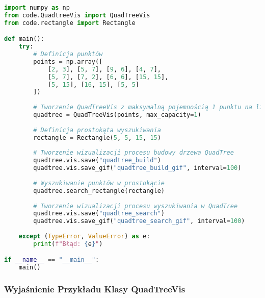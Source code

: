 \documentclass[12pt]{article}
\begin{document}
\begin{lstlisting}[language=Python, caption=Przykład użycia klasy QuadTreeVis, style=examplestyle]
import numpy as np
from code.QuadtreeVis import QuadTreeVis
from code.rectangle import Rectangle

def main():
    try:
        # Definicja punktów
        points = np.array([
            [2, 3], [5, 7], [9, 6], [4, 7],
            [5, 7], [7, 2], [6, 6], [15, 15],
            [5, 15], [16, 15], [5, 5]
        ])
        
        # Tworzenie QuadTreeVis z maksymalną pojemnością 1 punktu na liść
        quadtree = QuadTreeVis(points, max_capacity=1)
        
        # Definicja prostokąta wyszukiwania
        rectangle = Rectangle(5, 5, 15, 15)
        
        # Tworzenie wizualizacji procesu budowy drzewa QuadTree
        quadtree.vis.save("quadtree_build")
        quadtree.vis.save_gif("quadtree_build_gif", interval=100)
        
        # Wyszukiwanie punktów w prostokącie
        quadtree.search_rectangle(rectangle)
        
        # Tworzenie wizualizacji procesu wyszukiwania w QuadTree
        quadtree.vis.save("quadtree_search")
        quadtree.vis.save_gif("quadtree_search_gif", interval=100)
        
    except (TypeError, ValueError) as e:
        print(f"Błąd: {e}")

if __name__ == "__main__":
    main()
\end{lstlisting}

\subsubsection{Wyjaśnienie Przykładu Klasy QuadTreeVis}
\end{document}

